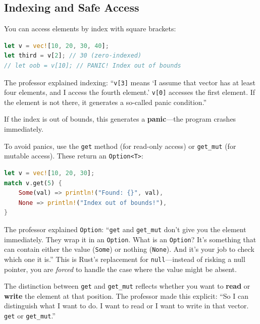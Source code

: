\subsection{Indexing and Safe Access}

You can access elements by index with square brackets:

\begin{lstlisting}[language=Rust]
let v = vec![10, 20, 30, 40];
let third = v[2]; // 30 (zero-indexed)
// let oob = v[10]; // PANIC! Index out of bounds
\end{lstlisting}

The professor explained indexing: ``\texttt{v[3]} means `I assume that vector has at least four elements, and I access the fourth element.' \texttt{v[0]} accesses the first element. If the element is not there, it generates a so-called panic condition.''

If the index is out of bounds, this generates a \textbf{panic}---the program crashes immediately.

To avoid panics, use the \texttt{get} method (for read-only access) or \texttt{get\_mut} (for mutable access). These return an \texttt{Option<T>}:

\begin{lstlisting}[language=Rust]
let v = vec![10, 20, 30];
match v.get(5) {
    Some(val) => println!("Found: {}", val),
    None => println!("Index out of bounds!"),
}
\end{lstlisting}

\begin{insightbox}
The professor explained \texttt{Option}: ``\texttt{get} and \texttt{get\_mut} don't give you the element immediately. They wrap it in an \texttt{Option}. What is an \texttt{Option}? It's something that can contain either the value (\texttt{Some}) or nothing (\texttt{None}). And it's your job to check which one it is.'' This is Rust's replacement for \texttt{null}---instead of risking a null pointer, you are \emph{forced} to handle the case where the value might be absent.
\end{insightbox}

The distinction between \texttt{get} and \texttt{get\_mut} reflects whether you want to \textbf{read} or \textbf{write} the element at that position. The professor made this explicit: ``So I can distinguish what I want to do. I want to read or I want to write in that vector. \texttt{get} or \texttt{get\_mut}.''

